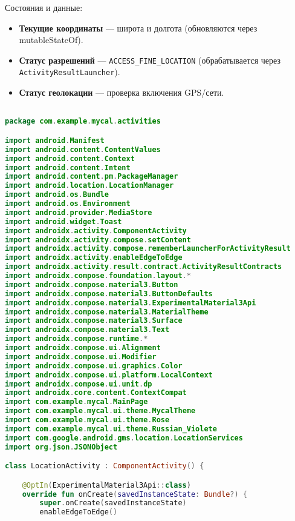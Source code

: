 Состояния и данные:

\begin{itemize}
    \item \textbf{Текущие координаты} — широта и долгота (обновляются через mutableStateOf).
    \item \textbf{Статус разрешений} — \texttt{ACCESS\_FINE\_LOCATION} (обрабатывается через \texttt{ActivityResultLauncher}).
    \item \textbf{Статус геолокации} — проверка включения GPS/сети.
\end{itemize}

\begin{lstlisting}[language=Kotlin, caption=MapPage.kt]

package com.example.mycal.activities

import android.Manifest
import android.content.ContentValues
import android.content.Context
import android.content.Intent
import android.content.pm.PackageManager
import android.location.LocationManager
import android.os.Bundle
import android.os.Environment
import android.provider.MediaStore
import android.widget.Toast
import androidx.activity.ComponentActivity
import androidx.activity.compose.setContent
import androidx.activity.compose.rememberLauncherForActivityResult
import androidx.activity.enableEdgeToEdge
import androidx.activity.result.contract.ActivityResultContracts
import androidx.compose.foundation.layout.*
import androidx.compose.material3.Button
import androidx.compose.material3.ButtonDefaults
import androidx.compose.material3.ExperimentalMaterial3Api
import androidx.compose.material3.MaterialTheme
import androidx.compose.material3.Surface
import androidx.compose.material3.Text
import androidx.compose.runtime.*
import androidx.compose.ui.Alignment
import androidx.compose.ui.Modifier
import androidx.compose.ui.graphics.Color
import androidx.compose.ui.platform.LocalContext
import androidx.compose.ui.unit.dp
import androidx.core.content.ContextCompat
import com.example.mycal.MainPage
import com.example.mycal.ui.theme.MycalTheme
import com.example.mycal.ui.theme.Rose
import com.example.mycal.ui.theme.Russian_Violete
import com.google.android.gms.location.LocationServices
import org.json.JSONObject

class LocationActivity : ComponentActivity() {

    @OptIn(ExperimentalMaterial3Api::class)
    override fun onCreate(savedInstanceState: Bundle?) {
        super.onCreate(savedInstanceState)
        enableEdgeToEdge()


\end{lstlisting}
